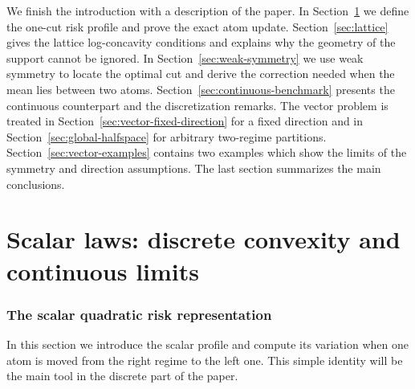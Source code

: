 \documentclass[a4paper]{amsart}
\numberwithin{equation}{section}
\theoremstyle{remark}
\newcommand{\1}{\mathbf 1}
\begin{document}
We finish the introduction with a description of the paper.  In
Section~\ref{sec:scalar-profile} we define the one-cut risk profile and prove
the exact atom update.  Section~\ref{sec:lattice} gives the lattice
log-concavity conditions and explains why the geometry of the support cannot
be ignored.  In Section~\ref{sec:weak-symmetry} we use weak symmetry to locate
the optimal cut and derive the correction needed when the mean lies between
two atoms.  Section~\ref{sec:continuous-benchmark} presents the continuous
counterpart and the discretization remarks.  The vector problem is treated in
Section~\ref{sec:vector-fixed-direction} for a fixed direction and in
Section~\ref{sec:global-halfspace} for arbitrary two-regime partitions.
Section~\ref{sec:vector-examples} contains two examples which show the limits
of the symmetry and direction assumptions.  The last section summarizes the
main conclusions.

\part{Scalar laws: discrete convexity and continuous limits}

\section{The scalar quadratic risk representation}
\label{sec:scalar-profile}

In this section we introduce the scalar profile and compute its variation when
one atom is moved from the right regime to the left one.  This simple identity
will be the main tool in the discrete part of the paper.
\end{document}
